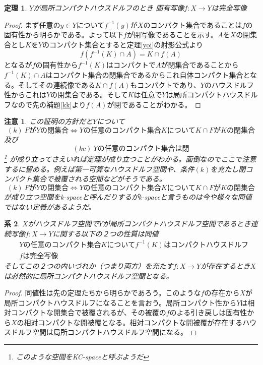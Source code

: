 \documentclass[leqno]{jsarticle}
\newtheorem{thm}{定理}
\newtheorem{cor}[thm]{系}
\newtheorem*{cau}{注意}
\begin{document}
\begin{thm}
$Y$が局所コンパクトハウスドルフのとき
固有写像$f:X\to Y$は完全写像
\end{thm}
\begin{proof}
まず任意の$y\in Y$について$f^{-1}(y)$が$X$のコンパクト集合であることは$f$の固有性から明らかである。よって以下$f$が閉写像であることを示す。$A$を$X$の閉集合とし$K$を$Y$のコンパクト集合とすると定理\ref{yoi}の射影公式より
\[
f(f^{-1}(K)\cap A)=K\cap f(A)
\]
となるが$f$の固有性から$f^{-1}(K)$はコンパクトで$A$が閉集合であることから$f^{-1}(K)\cap A$はコンパクト集合の閉集合であるからこれ自体コンパクト集合となる。そしてその連続像である$K\cap f(A)$もコンパクトであり、$Y$のハウスドルフ性からこれは$Y$の閉集合である。そして$K$は任意で$Y$は局所コンパクトハウスドルフなので先の補題\ref{kk}$よりf(A)$が閉であることがわかる。
\end{proof}
\begin{cau}
この証明の方針だと$Y$について
\[
(k)\ FがYの閉集合\iff Yの任意のコンパクト集合KについてK\cap FがKの閉集合
\]
及び
\[
(kc)\ Yの任意のコンパクト集合は閉
\]\footnote{このような空間をKC-spaceと呼ぶようだ}
が成り立ってさえいれば定理が成り立つことがわかる。面倒なのでここで注意するに留める。例えば第一可算なハウスドルフ空間や、条件$(k)$を充たし閉コンパクト集合で被覆される空間などがそうである。
\[
(k)\ FがYの閉集合\iff Yの任意のコンパクト集合KについてK\cap FがKの閉集合
\]が成り立つ空間をk-spaceと呼んだりするがk-spaceと言うものは今や様々な同値ではない定義があるようだ。
\end{cau}
\begin{cor}\label{kei}
$X$がハウスドルフ空間で$Y$が局所コンパクトハウスドルフ空間であるとき連続写像$f:X\to Y$に関する以下の２つの性質は同値
\begin{eqnarray*}
&Yの任意のコンパクト集合Kについてf^{-1}(K)はコンパクトハウスドルフ\\ 
&fは完全写像
\end{eqnarray*}
そしてこの２つの内いづれか（つまり両方）を充たす$f:X\to Y$が存在するとき$X$は必然的に局所コンパクトハウスドルフ空間となる。
\end{cor}
\begin{proof}
同値性は先の定理たちから明らかであろう。このような$f$の存在から$X$が局所コンパクトハウスドルフになることを言おう。局所コンパクト性から$Y$は相対コンパクトな開集合で被覆されるが、その被覆の$f$のよる引き戻しは固有性から$X$の相対コンパクトな開被覆となる。相対コンパクトな開被覆が存在するハウスドルフ空間は局所コンパクトハウスドルフ空間になる。
\end{proof}
\end{document}
